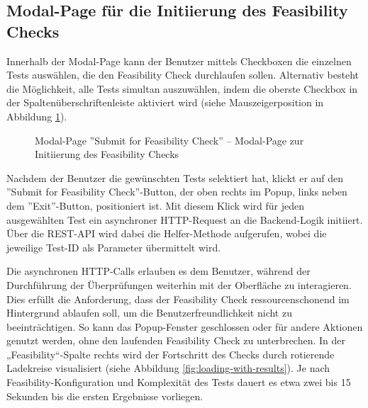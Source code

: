 \subsection{Modal-Page für die Initiierung des Feasibility Checks}

Innerhalb der Modal-Page kann der Benutzer mittels Checkboxen die einzelnen Tests auswählen, die den Feasibility Check durchlaufen sollen. Alternativ besteht die Möglichkeit, alle Tests simultan auszuwählen, indem die oberste Checkbox in der Spaltenüberschriftenleiste aktiviert wird (siehe Mauszeigerposition in Abbildung \ref{fig:submit-page}).

\begin{figure}[!htbp] 
    \centering 
    \caption{Modal-Page ''Submit for Feasibility Check'' – Modal-Page zur Initiierung des Feasibility Checks} 
    \label{fig:submit-page} 
\end{figure}

Nachdem der Benutzer die gewünschten Tests selektiert hat, klickt er auf den \linebreak ''Submit for Feasibility Check''-Button, der oben rechts im Popup, links neben dem ''Exit''-Button, positioniert ist. Mit diesem Klick wird für jeden ausgewählten Test ein asynchroner HTTP-Request an die Backend-Logik initiiert. Über die REST-API wird dabei die Helfer-Methode aufgerufen, wobei die jeweilige Test-ID als Parameter übermittelt wird.

Die asynchronen HTTP-Calls erlauben es dem Benutzer, während der Durchführung der Überprüfungen weiterhin mit der Oberfläche zu interagieren. Dies erfüllt die Anforderung, dass der Feasibility Check ressourcenschonend im Hintergrund ablaufen soll, um die Benutzerfreundlichkeit nicht zu beeinträchtigen. So kann das Popup-Fenster geschlossen oder für andere Aktionen genutzt werden, ohne den laufenden Feasibility Check zu unterbrechen. In der „Feasibility“-Spalte rechts wird der Fortschritt des Checks durch rotierende Ladekreise visualisiert (siehe Abbildung \ref{fig:loading-with-results}). Je nach Feasibility-Konfiguration und Komplexität des Tests dauert es etwa zwei bis 15 Sekunden bis die ersten Ergebnisse vorliegen.

